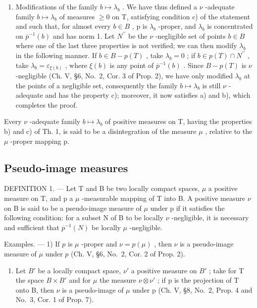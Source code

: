 \begin{enumerate}
\def\labelenumi{\arabic{enumi})}
\setcounter{enumi}{4}
\tightlist
\item
  Modifications of the family \(b \mapsto \lambda_{b}\) . We have thus defined a \(\nu\) -adequate family \(b \mapsto \lambda_{b}\) of measures \(\geqslant 0\) on T, satisfying condition c) of the statement and such that, for almost every \(b \in B\) , p is \(\lambda_{b}\) -proper, and \(\lambda_{b}\) is concentrated on \(\overline{p}^{-1}(b)\) and has norm 1. Let \(N^{\prime\prime}\) be the \(\nu\) -negligible set of points \(b \in B\) where one of the last three properties is not verified; we can then modify \(\lambda_{b}\) in the following manner. If \(b \in B - p(T)\) , take \(\lambda_{b} = 0\) ; if \(b \in p(T) \cap N^{\prime\prime}\) , take \(\lambda_{b} = \varepsilon_{\xi(b)}\) , where \(\xi(b)\) is any point of \(\overline{p}^{-1}(b)\) . Since \(B - p(T)\) is \(\nu\) -negligible (Ch. V, §6, No.~2, Cor. 3 of Prop. 2), we have only modified \(\lambda_{b}\) at the points of a negligible set, consequently the family \(b \mapsto \lambda_{b}\) is still \(\nu\) -adequate and has the property c); moreover, it now satisfies a) and b), which completes the proof.
\end{enumerate}

Every \(\nu\) -adequate family \(b \mapsto \lambda_{b}\) of positive measures on T, having the properties b) and c) of Th. 1, is said to be a disintegration of the measure \(\mu\) , relative to the \(\mu\) -proper mapping p.

\subsection{Pseudo-image measures}

DEFINITION 1. --- Let T and B be two locally compact spaces, \(\mu\) a positive measure on T, and p a \(\mu\) -measurable mapping of T into B. A positive measure \(\nu\) on B is said to be a pseudo-image measure of \(\mu\) under p if it satisfies the following condition: for a subset N of B to be locally \(\nu\) -negligible, it is necessary and sufficient that \(\overline{p}^{-1}(N)\) be locally \(\mu\) -negligible.

Examples. --- 1) If \(p\) is \(\mu\) -proper and \(\nu = p(\mu)\) , then \(\nu\) is a pseudo-image measure of \(\mu\) under \(p\) (Ch. V, §6, No.~2, Cor. 2 of Prop. 2).

\begin{enumerate}
\def\labelenumi{\arabic{enumi})}
\setcounter{enumi}{1}
\tightlist
\item
  Let \(B'\) be a locally compact space, \(\nu'\) a positive measure on \(B'\) ; take for T the space \(B \times B'\) and for \(\mu\) the measure \(\nu \otimes \nu'\) ; if p is the projection of T onto B, then \(\nu\) is a pseudo-image of \(\mu\) under p (Ch. V, §8, No.~2, Prop. 4 and No.~3, Cor. 1 of Prop. 7).
\end{enumerate}

